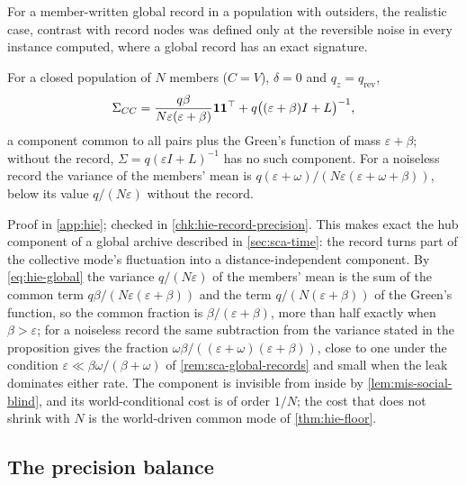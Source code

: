 For a member-written global record in a population with outsiders, the realistic case, contrast with record nodes was defined only at the reversible noise in every instance computed, where a global record has an exact signature.

\begin{proposition}\label{prop:hie-global-record}
For a closed population of $N$ members ($C=V$), $\delta=0$ and $q_z=q_{\mathrm{rev}}$,
\begin{equation}\label{eq:hie-global}
\Sigma_{CC}=\frac{q\beta}{N\varepsilon(\varepsilon+\beta)}\mathbf{1}\mathbf{1}^\top+q\bigl((\varepsilon+\beta)I+L\bigr)^{-1},
\end{equation}
a component common to all pairs plus the Green's function of mass $\varepsilon+\beta$; without the record, $\Sigma=q(\varepsilon I+L)^{-1}$ has no such component. For a noiseless record the variance of the members' mean is $q(\varepsilon+\omega)/(N\varepsilon(\varepsilon+\omega+\beta))$, below its value $q/(N\varepsilon)$ without the record.
\end{proposition}

Proof in \cref{app:hie}; checked in \cref{chk:hie-record-precision}. This makes exact the hub component of a global archive described in \cref{sec:sca-time}: the record turns part of the collective mode's fluctuation into a distance-independent component. By \eqref{eq:hie-global} the variance $q/(N\varepsilon)$ of the members' mean is the sum of the common term $q\beta/(N\varepsilon(\varepsilon+\beta))$ and the term $q/(N(\varepsilon+\beta))$ of the Green's function, so the common fraction is $\beta/(\varepsilon+\beta)$, more than half exactly when $\beta>\varepsilon$; for a noiseless record the same subtraction from the variance stated in the proposition gives the fraction $\omega\beta/((\varepsilon+\omega)(\varepsilon+\beta))$, close to one under the condition $\varepsilon\ll\beta\omega/(\beta+\omega)$ of \cref{rem:sca-global-records} and small when the leak dominates either rate. The component is invisible from inside by \cref{lem:mis-social-blind}, and its world-conditional cost is of order $1/N$; the cost that does not shrink with $N$ is the world-driven common mode of \cref{thm:hie-floor}.

\subsection{The precision balance}\label{sec:hie-balance}

